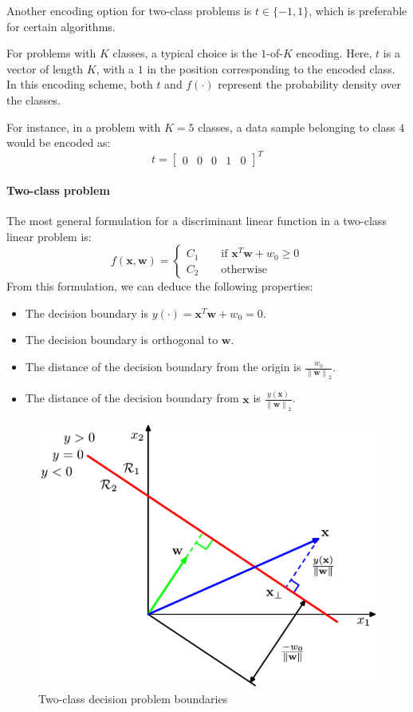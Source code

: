 Another encoding option for two-class problems is $t \in \{-1,1\}$, which is preferable for certain algorithms.

For problems with $K$ classes, a typical choice is the $1$-of-$K$ encoding. 
Here, $t$ is a vector of length $K$, with a $1$  in the position corresponding to the encoded class.
In this encoding scheme, both $t$ and $f(\cdot)$ represent the probability density over the classes.
\begin{example}
    For instance, in a problem with $K=5$ classes, a data sample belonging to class $4$ would be encoded as:
    \[t=\begin{bmatrix} 0 & 0 & 0 & 1 & 0 \end{bmatrix}^T\] 
\end{example}

\paragraph*{Two-class problem}
The most general formulation for a discriminant linear function in a two-class linear problem is:
\[f(\textbf{x},\textbf{w})=\begin{cases}
    C_1 \qquad \text{if } \textbf{x}^T\textbf{w}+w_0 \geq 0 \\
    C_2 \qquad \text{otherwise}
\end{cases}\]
From this formulation, we can deduce the following properties:
\begin{itemize}
    \item The decision boundary is $y(\cdot)=\textbf{x}^T\textbf{w}+w_0=0$. 
    \item The decision boundary is orthogonal to $\textbf{w}$. 
    \item The distance of the decision boundary from the origin is $\frac{w_0}{\left\lVert \textbf{w}\right\rVert_2 }$.
    \item The distance of the decision boundary from $\textbf{x}$ is $\frac{y(\textbf{x})}{\left\lVert \textbf{w}\right\rVert_2 }$.
\end{itemize}
\begin{figure}[H]
    \centering
    \includegraphics[width=0.35\linewidth]{images/2c.png}
    \caption{Two-class decision problem boundaries}
\end{figure}

